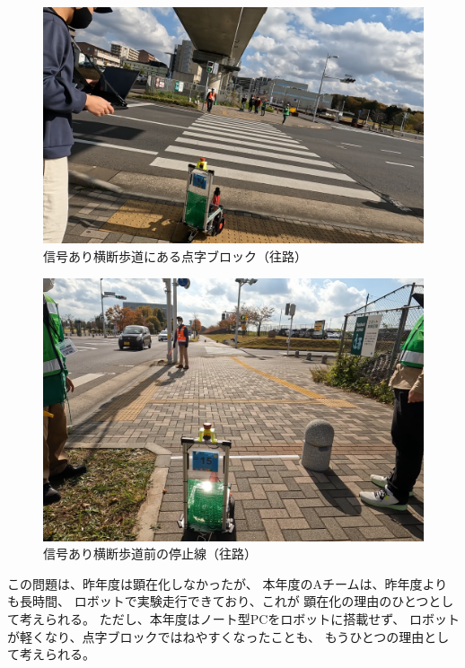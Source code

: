 \documentclass[twocolumn,9pt]{jsproceedings}
\begin{document}
\begin{figure}[h]
  \begin{center}
    \includegraphics[width=1.0\linewidth]{figs/stop_second_stop_position.pdf}
	  \caption{信号あり横断歩道にある点字ブロック（往路）}
    \label{fig:stop_second_stop_position}
  \end{center}
\end{figure}

\begin{figure}[h]
  \begin{center}
    \includegraphics[width=1.0\linewidth]{figs/stop_first_stop_position.pdf}
	  \caption{信号あり横断歩道前の停止線（往路）}
    \label{fig:stop_first_stop_position}
  \end{center}
\end{figure}

この問題は、昨年度は顕在化しなかったが、
本年度のAチームは、昨年度よりも長時間、
ロボットで実験走行できており、これが
顕在化の理由のひとつとして考えられる。
ただし、本年度はノート型PCをロボットに搭載せず、
ロボットが軽くなり、点字ブロックではねやすくなったことも、
もうひとつの理由として考えられる。
\end{document}
